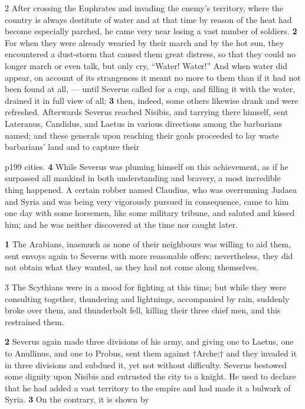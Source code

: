 2 After crossing the Euphrates and invading the enemy's territory, where the country is always destitute of water and at that time by reason of the heat had become especially parched, he came very near losing a vast number of soldiers. \textbf{2} For when they were already wearied by their march and by the hot sun, they encountered a dust-storm that caused them great distress, so that they could no longer march or even talk, but only cry, ``Water! Water!'' And when water did appear, on account of its strangeness it meant no more to them than if it had not been found at all, \texthebrew{—} until Severus called for a cup, and filling it with the water, drained it in full view of all; \textbf{3} then, indeed, some others likewise drank and were refreshed. Afterwards Severus reached Nisibis, and tarrying there himself, sent Lateranus, Candidus, and Laetus in various directions among the barbarians named; and these generals upon reaching their goals proceeded to lay waste barbarians' land and to capture their

p199 cities. \textbf{4} While Severus was pluming himself on this achievement, as if he surpassed all mankind in both understanding and bravery, a most incredible thing happened. A certain robber named Claudius, who was overrunning Judaea and Syria and was being very vigorously pursued in consequence, came to him one day with some horsemen, like some military tribune, and saluted and kissed him; and he was neither discovered at the time nor caught later.

\textbf{1} The Arabians, inasmuch as none of their neighbours was willing to aid them, sent envoys again to Severus with more reasonable offers; nevertheless, they did not obtain what they wanted, as they had not come along themselves.

3 The Scythians were in a mood for fighting at this time; but while they were consulting together, thundering and lightnings, accompanied by rain, suddenly broke over them, and thunderbolt fell, killing their three chief men, and this restrained them.

\textbf{2} Severus again made three divisions of his army, and giving one to Laetus, one to Anullinus, and one to Probus, sent them against \texthebrew{†}Arche;\texthebrew{†} and they invaded it in three divisions and subdued it, yet not without difficulty. Severus bestowed some dignity upon Nisibis and entrusted the city to a knight. He used to declare that he had added a vast territory to the empire and had made it a bulwark of Syria. \textbf{3} On the contrary, it is shown by


